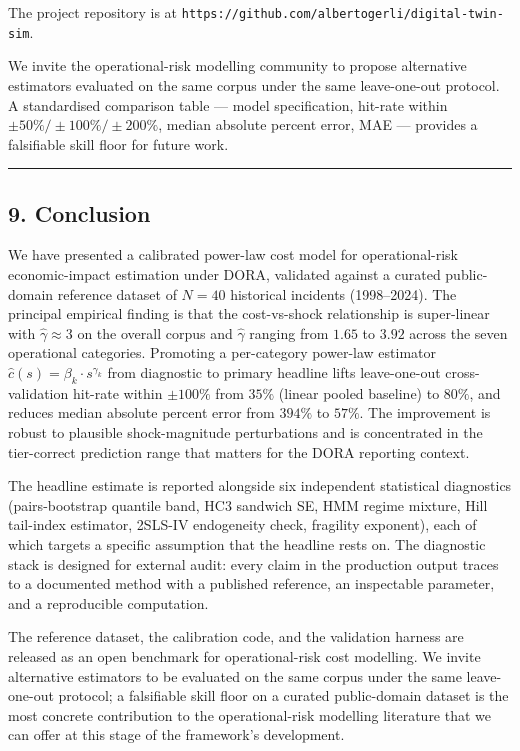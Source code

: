 \documentclass[
]{article}
\begin{document}
The project repository is at
\texttt{https://github.com/albertogerli/digital-twin-sim}.

We invite the operational-risk modelling community to propose
alternative estimators evaluated on the same corpus under the same
leave-one-out protocol. A standardised comparison table --- model
specification, hit-rate within \(\pm 50\%/\pm 100\%/\pm 200\%\), median
absolute percent error, MAE --- provides a falsifiable skill floor for
future work.

\begin{center}\rule{0.5\linewidth}{0.5pt}\end{center}

\subsection{9. Conclusion}\label{conclusion}

We have presented a calibrated power-law cost model for operational-risk
economic-impact estimation under DORA, validated against a curated
public-domain reference dataset of \(N=40\) historical incidents
(1998--2024). The principal empirical finding is that the cost-vs-shock
relationship is super-linear with \(\hat{\gamma} \approx 3\) on the
overall corpus and \(\hat{\gamma}\) ranging from \(1.65\) to \(3.92\)
across the seven operational categories. Promoting a per-category
power-law estimator \(\hat{c}(s) = \beta_k \cdot s^{\gamma_k}\) from
diagnostic to primary headline lifts leave-one-out cross-validation
hit-rate within \(\pm 100\%\) from \(35\%\) (linear pooled baseline) to
\(80\%\), and reduces median absolute percent error from \(394\%\) to
\(57\%\). The improvement is robust to plausible shock-magnitude
perturbations and is concentrated in the tier-correct prediction range
that matters for the DORA reporting context.

The headline estimate is reported alongside six independent statistical
diagnostics (pairs-bootstrap quantile band, HC3 sandwich SE, HMM regime
mixture, Hill tail-index estimator, 2SLS-IV endogeneity check, fragility
exponent), each of which targets a specific assumption that the headline
rests on. The diagnostic stack is designed for external audit: every
claim in the production output traces to a documented method with a
published reference, an inspectable parameter, and a reproducible
computation.

The reference dataset, the calibration code, and the validation harness
are released as an open benchmark for operational-risk cost modelling.
We invite alternative estimators to be evaluated on the same corpus
under the same leave-one-out protocol; a falsifiable skill floor on a
curated public-domain dataset is the most concrete contribution to the
operational-risk modelling literature that we can offer at this stage of
the framework's development.
\end{document}
